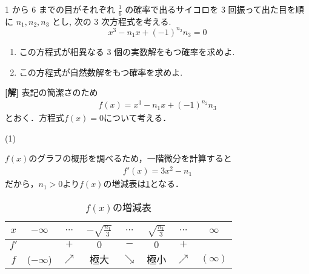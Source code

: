 \documentclass[a4paper,10pt]{ltjsarticle}
\begin{document}
\begin{oframed}
  1 から 6 までの目がそれぞれ $\frac{1}{6}$ の確率で出るサイコロを 3 回振って出た目を順に
  $n_1, n_2, n_3$ とし, 次の 3 次方程式を考える.
  $$ x^3 - n_1 x + (-1)^{n_2} n_3 = 0 $$
  \begin{enumerate}
    \item この方程式が相異なる 3 個の実数解をもつ確率を求めよ.
    \item この方程式が自然数解をもつ確率を求めよ.
  \end{enumerate}
\end{oframed}
\setlength{\columnseprule}{0.4pt}
\begin{multicols}{2}
  {\bf[解]}
  表記の簡潔さのため
  \begin{align*}
    f(x) = x^3 - n_1 x + (-1)^{n_2} n_3
  \end{align*}
  とおく．方程式$f(x)=0$について考える．

  \vspace{10pt}
  (1)

  $f(x)$のグラフの概形を調べるため，一階微分を計算すると
  \begin{align*}
    f'(x) = 3x^2 - n_1
  \end{align*}
  だから，$n_1>0$より$f(x)$の増減表は\cref{table:1}となる．

  \begin{table}[H]
    \centering
    \caption{$f(x)$の増減表}
    \label{table:1}
    \begin{tabular}{|c||c|c|c|c|c|c|c|}
      \hline
      $x$  & $-\infty$   & $\cdots$   & $-\sqrt{\frac{n_1}{3}}$ & $\cdots$   & $\sqrt{\frac{n_1}{3}}$ & $\cdots$   & $\infty$   \\
      \hline
      $f'$ &             & $+$        & $0$                     & $-$        & $0$                    & $+$        &            \\
      \hline
      $f$  & ($-\infty$) & $\nearrow$ & 極大                      & $\searrow$ & 極小                     & $\nearrow$ & $(\infty)$ \\
      \hline
    \end{tabular}
  \end{table}


\end{multicols}
\end{document}
